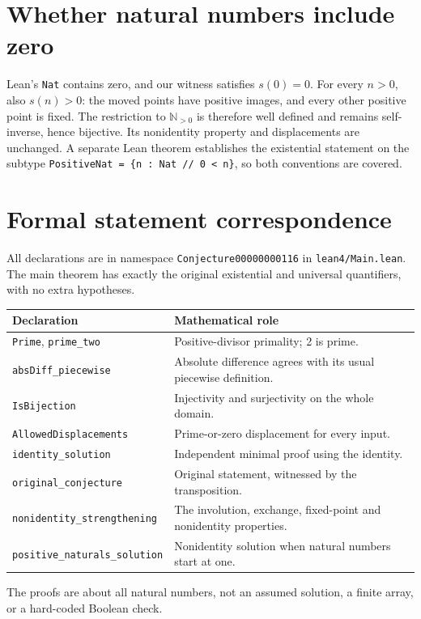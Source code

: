 \documentclass[10pt]{article}
\newcommand{\NN}{\mathbb{N}}
\begin{document}
\section{Whether natural numbers include zero}
Lean's \texttt{Nat} contains zero, and our witness satisfies $s(0)=0$.
For every $n>0$, also $s(n)>0$: the moved points have positive images,
and every other positive point is fixed. The restriction to $\NN_{>0}$
is therefore well defined and remains self-inverse, hence bijective.
Its nonidentity property and displacements are unchanged. A separate Lean
theorem establishes the existential statement on the subtype
\texttt{PositiveNat = \{n : Nat // 0 < n\}}, so both conventions are covered.

\newpage
\section{Formal statement correspondence}
All declarations are in namespace \texttt{Conjecture00000000116} in
\texttt{lean4/Main.lean}. The main theorem has exactly the original
existential and universal quantifiers, with no extra hypotheses.
\begin{center}
\small
\begin{tabular}{p{}p{}}
\hline
Declaration & Mathematical role \\
\hline
\texttt{Prime}, \texttt{prime\_two} & Positive-divisor primality; 2 is prime. \\
\texttt{absDiff\_piecewise} & Absolute difference agrees with its usual piecewise definition. \\
\texttt{IsBijection} & Injectivity and surjectivity on the whole domain. \\
\texttt{AllowedDisplacements} & Prime-or-zero displacement for every input. \\
\texttt{identity\_solution} & Independent minimal proof using the identity. \\
\texttt{original\_conjecture} & Original statement, witnessed by the transposition. \\
\texttt{nonidentity\_strengthening} & The involution, exchange, fixed-point and nonidentity properties. \\
\texttt{positive\_naturals\_solution} & Nonidentity solution when natural numbers start at one. \\
\hline
\end{tabular}
\end{center}
The proofs are about all natural numbers, not an assumed solution, a finite
array, or a hard-coded Boolean check.
\end{document}
